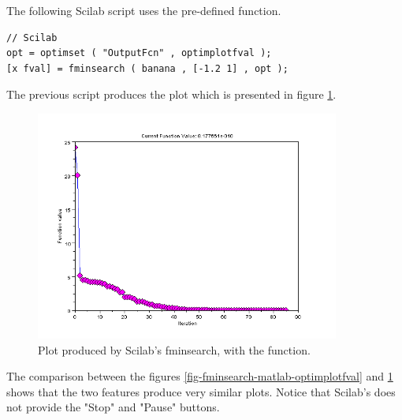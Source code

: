 The following Scilab script uses the 
pre-defined function.

\lstset{language=scilabscript}
\begin{lstlisting}
// Scilab
opt = optimset ( "OutputFcn" , optimplotfval );
[x fval] = fminsearch ( banana , [-1.2 1] , opt );
\end{lstlisting}

The previous script produces the plot which is presented in figure 
\ref{fig-fminsearch-scilab-optimplotfval}.

\begin{figure}
\begin{center}
\includegraphics[width=10cm]{testFminsearchOptimplotfvalScilab.png}
\end{center}
\caption{Plot produced by Scilab's fminsearch, with the  function.}
\label{fig-fminsearch-scilab-optimplotfval}
\end{figure}

The comparison between the figures \ref{fig-fminsearch-matlab-optimplotfval} and 
\ref{fig-fminsearch-scilab-optimplotfval} shows that the two features produce
very similar plots. Notice that Scilab's  does not 
provide the "Stop" and "Pause" buttons.

